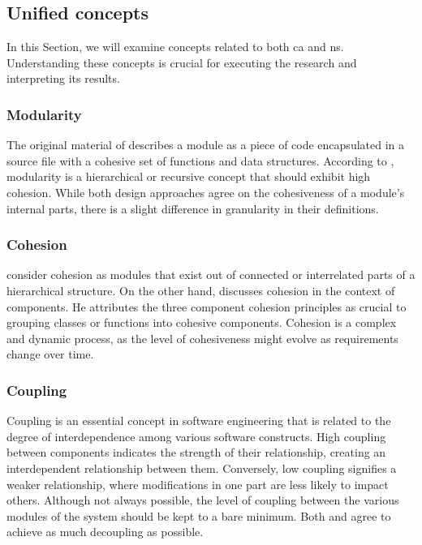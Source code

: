 \subsection{Unified concepts}
In this Section, we will examine concepts related to both \gls{ca} and \gls{ns}.
Understanding these concepts is crucial for executing the research and interpreting its
results.


\subsubsection{Modularity}
The original material of \textcite[82]{r_c_martin_clean_2018} describes a module as a 
piece of code encapsulated in a source file with a cohesive set of functions and data
structures. According to \textcite[22]{mannaert_normalized_2016}, modularity is a 
hierarchical or recursive concept that should exhibit high cohesion. While both design
approaches agree on the cohesiveness of a module's internal parts, there is a slight 
difference in granularity in their definitions.

\subsubsection{Cohesion}
\textcite[22]{mannaert_normalized_2016} consider cohesion as modules that exist out of
connected or interrelated parts of a hierarchical structure. On the other hand,
\textcite[118]{r_c_martin_clean_2018} discusses cohesion in the context of
components. He attributes the three component cohesion principles as crucial to grouping
classes or functions into cohesive components. Cohesion is a complex and dynamic process,
as the level of cohesiveness might evolve as requirements change over time. 

\subsubsection{Coupling}
Coupling is an essential concept in software engineering that is related to the degree of
interdependence among various software constructs. High coupling between components
indicates the strength of their relationship, creating an interdependent relationship
between them. Conversely, low coupling signifies a weaker relationship, where
modifications in one part are less likely to impact others. Although not always possible,
the level of coupling between the various modules of the system should be kept to a bare
minimum. Both \textcite[23]{mannaert_normalized_2016} and
\textcite[130]{r_c_martin_clean_2018} agree to achieve as much decoupling as possible.